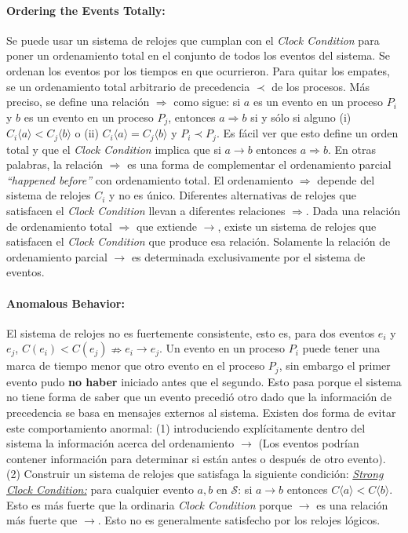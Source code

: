 \paragraph{\textnormal{\textbf{Ordering the Events Totally:}}}
Se puede usar un sistema de relojes que cumplan con el \emph{Clock Condition} para poner un ordenamiento total en el conjunto de todos los eventos del sistema. Se ordenan los eventos por los tiempos en que ocurrieron. Para quitar los empates, se un ordenamiento total arbitrario de precedencia $\prec$ de los procesos. Más preciso, se define una relación $\Rightarrow$ como sigue: si $a$ es un evento en un proceso $P_i$ y $b$ es un evento en un proceso $P_j$, entonces $a \Rightarrow b$ si y sólo si alguno (i) $C_i\langle a \rangle < C_j\langle b \rangle$ o (ii) $C_i\langle a \rangle = C_j\langle b \rangle$ y $P_i \prec P_j$. Es fácil ver que esto define un orden total y que el \emph{Clock Condition} implica que si $a \to b$ entonces $a \Rightarrow b$. En otras palabras, la relación $\Rightarrow$ es una forma de complementar el ordenamiento parcial \emph{``happened before''} con ordenamiento total. El ordenamiento $\Rightarrow$ depende  del sistema de relojes $C_i$ y no es único. Diferentes alternativas de relojes que satisfacen el \emph{Clock Condition} llevan a diferentes relaciones $\Rightarrow$. Dada una relación de ordenamiento total $\Rightarrow$ que extiende $\to$, existe un sistema de relojes que satisfacen el \emph{Clock Condition} que produce esa relación. Solamente la relación de ordenamiento parcial $\to$ es determinada exclusivamente por el sistema de eventos.

\paragraph{\textnormal{\textbf{Anomalous Behavior:}}}
El sistema de relojes no es fuertemente consistente, esto es, para dos eventos $e_i$ y $e_j$, $C(e_i) < C(e_j) \nRightarrow e_i \to e_j$. Un evento en un proceso $P_i$ puede tener una marca de tiempo menor que otro evento en el proceso $P_j$, sin embargo el primer evento pudo \textbf{no haber} iniciado antes que el segundo. Esto pasa porque el sistema no tiene forma de saber que un evento precedió otro dado que la información de precedencia se basa en mensajes externos al sistema. Existen dos forma de evitar este comportamiento anormal: (1) introduciendo explícitamente dentro del sistema la información acerca del ordenamiento $\to$ (Los eventos podrían contener información para determinar si están antes o después de otro evento). (2) Construir un sistema de relojes que satisfaga la siguiente condición: \underline{\textit{Strong Clock Condition:}} para cualquier evento $a, b$ en $\mathscr{S}$: si $a \boldsymbol{\to}  b$ entonces $C\langle a \rangle < C\langle b \rangle$. Esto es más fuerte que la ordinaria \emph{Clock Condition} porque $\boldsymbol{\to}$ es una relación más fuerte que $\to$. Esto no es generalmente satisfecho por los relojes lógicos.

